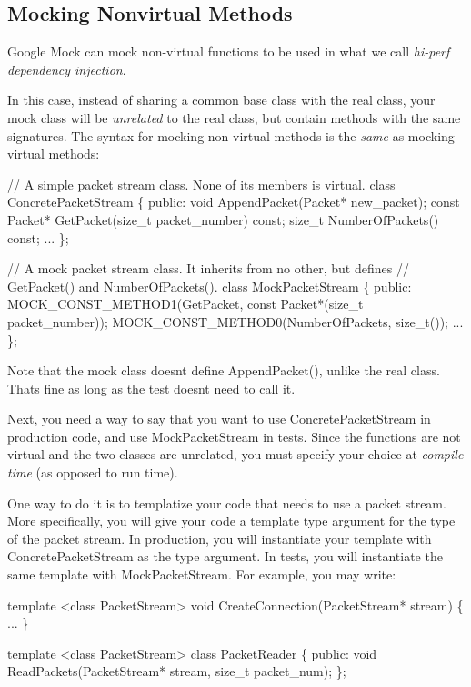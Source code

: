\subsection*{Mocking Nonvirtual Methods}

Google Mock can mock non-\/virtual functions to be used in what we call {\itshape hi-\/perf dependency injection}.

In this case, instead of sharing a common base class with the real class, your mock class will be {\itshape unrelated} to the real class, but contain methods with the same signatures. The syntax for mocking non-\/virtual methods is the {\itshape same} as mocking virtual methods\+:


\begin{DoxyCode}
// A simple packet stream class.  None of its members is virtual.
class ConcretePacketStream \{
 public:
  void AppendPacket(Packet* new\_packet);
  const Packet* GetPacket(size\_t packet\_number) const;
  size\_t NumberOfPackets() const;
  ...
\};

// A mock packet stream class.  It inherits from no other, but defines
// GetPacket() and NumberOfPackets().
class MockPacketStream \{
 public:
  MOCK\_CONST\_METHOD1(GetPacket, const Packet*(size\_t packet\_number));
  MOCK\_CONST\_METHOD0(NumberOfPackets, size\_t());
  ...
\};
\end{DoxyCode}


Note that the mock class doesn\textquotesingle{}t define {\ttfamily Append\+Packet()}, unlike the real class. That\textquotesingle{}s fine as long as the test doesn\textquotesingle{}t need to call it.

Next, you need a way to say that you want to use {\ttfamily Concrete\+Packet\+Stream} in production code, and use {\ttfamily Mock\+Packet\+Stream} in tests. Since the functions are not virtual and the two classes are unrelated, you must specify your choice at {\itshape compile time} (as opposed to run time).

One way to do it is to templatize your code that needs to use a packet stream. More specifically, you will give your code a template type argument for the type of the packet stream. In production, you will instantiate your template with {\ttfamily Concrete\+Packet\+Stream} as the type argument. In tests, you will instantiate the same template with {\ttfamily Mock\+Packet\+Stream}. For example, you may write\+:


\begin{DoxyCode}
template <class PacketStream>
void CreateConnection(PacketStream* stream) \{ ... \}

template <class PacketStream>
class PacketReader \{
 public:
  void ReadPackets(PacketStream* stream, size\_t packet\_num);
\};
\end{DoxyCode}


